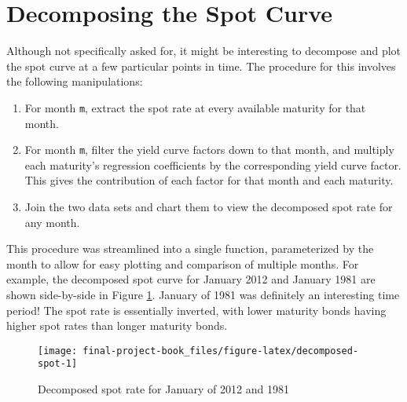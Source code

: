 \documentclass[openany]{book}
\providecommand{\tightlist}{%
  \setlength{\itemsep}{0pt}\setlength{\parskip}{0pt}}
\theoremstyle{definition}
\theoremstyle{definition}
\theoremstyle{definition}
\theoremstyle{remark}
\begin{document}
\normalsize

\hypertarget{decomposing-the-spot-curve}{%
\section{Decomposing the Spot Curve}\label{decomposing-the-spot-curve}}

Although not specifically asked for, it might be interesting to
decompose and plot the spot curve at a few particular points in time.
The procedure for this involves the following manipulations:

\begin{enumerate}
\def\labelenumi{\arabic{enumi})}
\tightlist
\item
  For month \texttt{m}, extract the spot rate at every available
  maturity for that month.
\item
  For month \texttt{m}, filter the yield curve factors down to that
  month, and multiply each maturity's regression coefficients by the
  corresponding yield curve factor. This gives the contribution of each
  factor for that month and each maturity.
\item
  Join the two data sets and chart them to view the decomposed spot rate
  for any month.
\end{enumerate}

\small

\normalsize

\small

\normalsize

\small

\normalsize

\small

\normalsize

This procedure was streamlined into a single function, parameterized by
the month to allow for easy plotting and comparison of multiple months.
For example, the decomposed spot curve for January 2012 and January 1981
are shown side-by-side in Figure \ref{fig:decomposed-spot}. January of
1981 was definitely an interesting time period! The spot rate is
essentially inverted, with lower maturity bonds having higher spot rates
than longer maturity bonds.

\small

\begin{figure}[H]

{\centering \texttt{[image: final-project-book\_files/figure-latex/decomposed-spot-1]} 

}

\caption{Decomposed spot rate for January of 2012 and 1981}\label{fig:decomposed-spot}
\end{figure}
\end{document}
